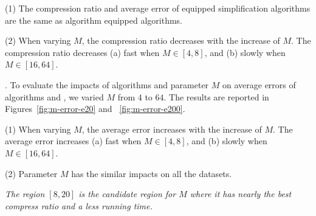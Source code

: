 \ni(1) The compression ratio and average error of \rpia equipped simplification algorithms are the same as algorithm \cpia equipped algorithms.

\ni(2) When varying $M$, the compression ratio decreases with the increase of $M$.
The compression ratio decreases (a) fast when $M \in [4,8]$, and (b) slowly when $M \in [16, 64]$.


.
To evaluate the impacts of algorithms \rpia and parameter $M$ on average errors of algorithms \cist and \cista, we varied $M$ from $4$ to $64$.
The results are reported in Figures~\ref{fig:m-error-e20} and ~\ref{fig:m-error-e200}.


\ni(1) When varying $M$, the average error increases with the increase of $M$.
The average error increases (a) fast when $M \in [4,8]$, and (b) slowly when $M \in [16, 64]$.

\ni(2) Parameter $M$ has the similar impacts on all the datasets.

\emph{The region $[8, 20]$ is the candidate region for $M$ where it has nearly the best compress ratio and a less running time.}








